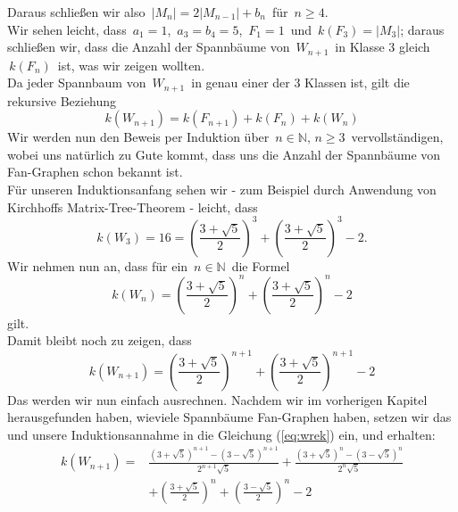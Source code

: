 Daraus schließen wir also $\,|M_{n}|=2|M_{n-1}|+b_{n}\,$ für $\,n\geq4$.\; \\
Wir sehen leicht, dass $\,a_1=1$,\; $\,a_3=b_4=5$,\; $\,F_1=1\,$ und $\,\mathit{k}\left(F_3\right)=|M_3|$; daraus schließen wir, dass die Anzahl der Spannbäume von $\,W_{n+1}\,$ in Klasse 3 gleich $\,\mathit{k}\left(F_{n}\right)\,$ ist, was wir zeigen wollten.\\
Da jeder Spannbaum von $\,W_{n+1}\,$ in genau einer der 3 Klassen ist, gilt die rekursive Beziehung
\begin{equation}
\mathit{k}\left(W_{n+1}\right) = \mathit{k}\left(F_{n+1}\right) + \mathit{k}\left(F_n\right) + \mathit{k}\left(W_n\right)
\label{eq:wrek}
\end{equation}
Wir werden nun den Beweis per Induktion über $\,n \in \mathbb{N}, \, n \geq 3\,$ vervollständigen, wobei uns natürlich zu Gute kommt, dass uns die Anzahl der Spannbäume von Fan-Graphen schon bekannt ist.\\
Für unseren Induktionsanfang sehen wir - zum Beispiel durch Anwendung von Kirchhoffs Matrix-Tree-Theorem - leicht, dass \begin{equation*}
\mathit{k}\left(W_3\right) = 16 = \left(\frac{3+\sqrt{5}}{2}\right)^3+\left(\frac{3+\sqrt{5}}{2}\right)^3-2.
\end{equation*}
Wir nehmen nun an, dass für ein $\,n \in \mathbb{N}\,$ die Formel 
\begin{equation*}
 \mathit{k}\left(W_n\right) = \left(\frac{3+\sqrt{5}}{2}\right)^n+\left(\frac{3+\sqrt{5}}{2}\right)^n-2
\end{equation*}
gilt.\\
Damit bleibt noch zu zeigen, dass
\begin{equation*}
 \mathit{k}\left(W_{n+1}\right) = \left(\frac{3+\sqrt{5}}{2}\right)^{n+1}+\left(\frac{3+\sqrt{5}}{2}\right)^{n+1}-2
\end{equation*}
Das werden wir nun einfach ausrechnen.
Nachdem wir im vorherigen Kapitel herausgefunden haben, wieviele Spannbäume Fan-Graphen haben, setzen wir das und unsere Induktionsannahme in die Glei\-chung (\ref{eq:wrek}) ein, und erhalten:\\
\begin{equation*}
\begin{aligned}
\mathit{k}\left(W_{n+1}\right) ={} & \frac{\left(3+\sqrt{5}\right)^{n+1}-\left(3-\sqrt{5}\right)^{n+1}}{2^{n+1}\sqrt{5}} + \frac{\left(3+\sqrt{5}\right)^{n}-\left(3-\sqrt{5}\right)^{n}}{2^{n}\sqrt{5}}\\
& + \left(\frac{3+\sqrt{5}}{2}\right)^n+\left(\frac{3-\sqrt{5}}{2}\right)^n-2
\end{aligned}
\end{equation*}
